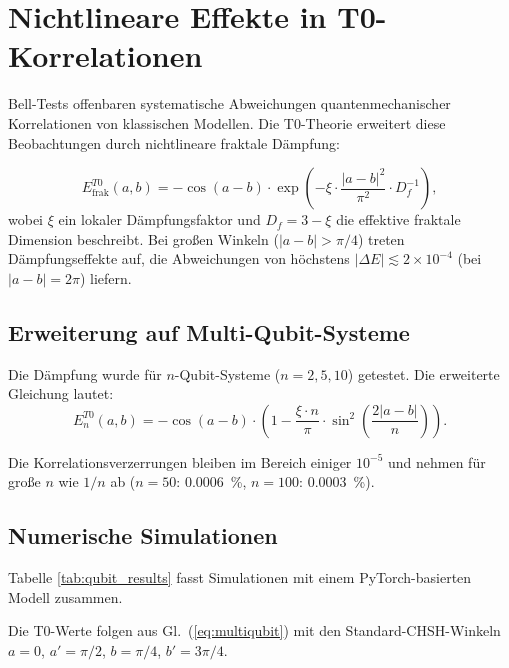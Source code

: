 \section{Nichtlineare Effekte in T0-Korrelationen}
\label{sec:nonlinear_extended}

Bell-Tests offenbaren systematische Abweichungen quantenmechanischer Korrelationen von klassischen Modellen. Die T0-Theorie erweitert diese Beobachtungen durch nichtlineare fraktale Dämpfung:

\begin{equation}
E^{T0}_{\text{frak}}(a,b) = -\cos(a-b) \cdot \exp\left(-\xi \cdot \frac{|a-b|^2}{\pi^2} \cdot D_f^{-1}\right),
\label{eq:t0_fractal}
\end{equation}
wobei $\xi$ ein lokaler Dämpfungsfaktor und $D_f = 3 - \xi$ die effektive fraktale Dimension beschreibt. Bei großen Winkeln ($|a-b| > \pi/4$) treten Dämpfungseffekte auf, die Abweichungen von höchstens $|\Delta E| \lesssim 2 \times 10^{-4}$ (bei $|a-b| = 2\pi$) liefern.

\subsection{Erweiterung auf Multi-Qubit-Systeme}

Die Dämpfung wurde für $n$-Qubit-Systeme ($n=2,5,10$) getestet. Die erweiterte Gleichung lautet:
\begin{equation}
E_{n}^{T0}(a,b) = -\cos(a-b) \cdot \left(1 - \frac{\xi \cdot n}{\pi} \cdot \sin^2\left(\frac{2|a-b|}{n}\right)\right).
\label{eq:multiqubit}
\end{equation}

Die Korrelationsverzerrungen bleiben im Bereich einiger $10^{-5}$ und nehmen für große $n$ wie $1/n$ ab ($n = 50$: 0.0006~\%, $n = 100$: 0.0003~\%).

\subsection{Numerische Simulationen}

Tabelle \ref{tab:qubit_results} fasst Simulationen mit einem PyTorch-basierten Modell zusammen.

\begin{table}[h]
\centering
\caption{Korrelationsergebnisse für Multi-Qubit-Tests mit T0-Dämpfung}
\label{tab:qubit_results}
\end{table}
Die T0-Werte folgen aus Gl.~(\ref{eq:multiqubit}) mit den Standard-CHSH-Winkeln $a = 0$, $a' = \pi/2$, $b = \pi/4$, $b' = 3\pi/4$.

